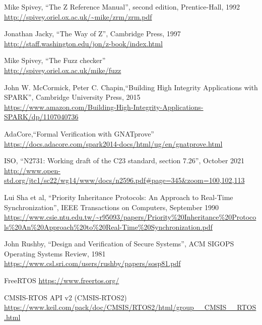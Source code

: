 \documentclass{AUJarticle}
\begin{document}
\begin{thebibliography}{9}

Mike Spivey, ``The Z Reference Manual'', second edition, Prentice-Hall, 1992 \\
\url{http://spivey.oriel.ox.ac.uk/~mike/zrm/zrm.pdf}

Jonathan Jacky, ``The Way of Z'', Cambridge Press, 1997 \\
\url{http://staff.washington.edu/jon/z-book/index.html}

Mike Spivey, ``The Fuzz checker'' \\
\url{http://spivey.oriel.ox.ac.uk/mike/fuzz}

John W. McCormick, Peter C. Chapin,``Building High Integrity Applications with SPARK'', Cambridge University Press, 2015 \\
\url{https://www.amazon.com/Building-High-Integrity-Applications-SPARK/dp/1107040736}

AdaCore,``Formal Verification with GNATprove'' \\
\url{https://docs.adacore.com/spark2014-docs/html/ug/en/gnatprove.html}

ISO, ``N2731: Working draft of the C23 standard, section 7.26'', October 2021 \\
\url{http://www.open-std.org/jtc1/sc22/wg14/www/docs/n2596.pdf#page=345&zoom=100,102,113}

Lui Sha et al, ``Priority Inheritance Protocols: An Approach to Real-Time Synchronization'', IEEE Transactions on Computers, September 1990 \\
\url{https://www.csie.ntu.edu.tw/~r95093/papers/Priority%20Inheritance%20Protocols%20An%20Approach%20to%20Real-Time%20Synchronization.pdf}

John Rushby, ``Design and Verification of Secure Systems'', ACM SIGOPS Operating Systems Review, 1981 \\
\url{https://www.csl.sri.com/users/rushby/papers/sosp81.pdf}

FreeRTOS
\url{https://www.freertos.org/}

CMSIS-RTOS API v2 (CMSIS-RTOS2)
\url{https://www.keil.com/pack/doc/CMSIS/RTOS2/html/group__CMSIS__RTOS.html}

\end{thebibliography}
\end{document}
